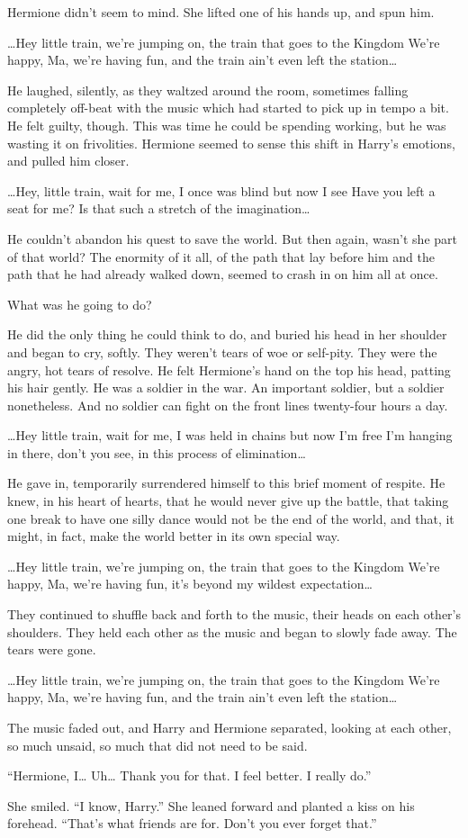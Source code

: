 Hermione didn’t seem to mind. She lifted one of his hands up, and spun him.

…Hey little train, we’re jumping on, the train that goes to the Kingdom
We’re happy, Ma, we’re having fun, and the train ain’t even left the station…

He laughed, silently, as they waltzed around the room, sometimes falling completely off-beat with the music which had started to pick up in tempo a bit. He felt guilty, though. This was time he could be spending working, but he was wasting it on frivolities. Hermione seemed to sense this shift in Harry’s emotions, and pulled him closer.

…Hey, little train, wait for me, I once was blind but now I see
Have you left a seat for me? Is that such a stretch of the imagination…

He couldn’t abandon his quest to save the world. But then again, wasn’t she part of that world? The enormity of it all, of the path that lay before him and the path that he had already walked down, seemed to crash in on him all at once.

What was he going to do?

He did the only thing he could think to do, and buried his head in her shoulder and began to cry, softly. They weren’t tears of woe or self-pity. They were the angry, hot tears of resolve. He felt Hermione’s hand on the top his head, patting his hair gently. He was a soldier in the war. An important soldier, but a soldier nonetheless. And no soldier can fight on the front lines twenty-four hours a day.

…Hey little train, wait for me, I was held in chains but now I’m free
I’m hanging in there, don’t you see, in this process of elimination…

He gave in, temporarily surrendered himself to this brief moment of respite. He knew, in his heart of hearts, that he would never give up the battle, that taking one break to have one silly dance would not be the end of the world, and that, it might, in fact, make the world better in its own special way.

…Hey little train, we’re jumping on, the train that goes to the Kingdom
We’re happy, Ma, we’re having fun, it’s beyond my wildest expectation…

They continued to shuffle back and forth to the music, their heads on each other’s shoulders. They held each other as the music and began to slowly fade away. The tears were gone.

…Hey little train, we’re jumping on, the train that goes to the Kingdom
We’re happy, Ma, we’re having fun, and the train ain’t even left the station…

The music faded out, and Harry and Hermione separated, looking at each other, so much unsaid, so much that did not need to be said.

“Hermione, I… Uh… Thank you for that. I feel better. I really do.”

She smiled. “I know, Harry.” She leaned forward and planted a kiss on his forehead. “That’s what friends are for. Don’t you ever forget that.”